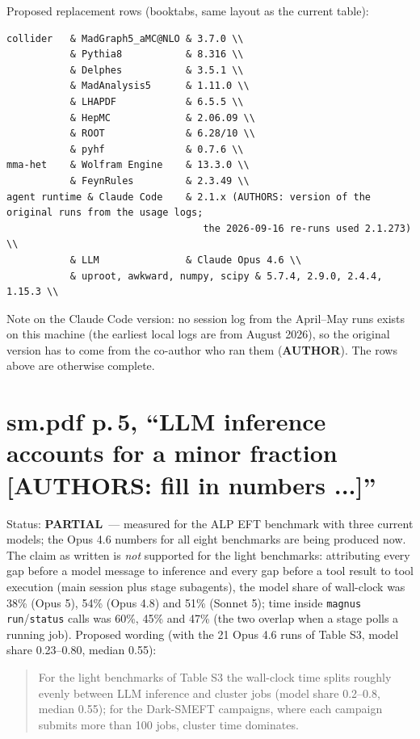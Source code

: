\documentclass[11pt]{article}
\newcommand{\statuspartial}{\textcolor{orange!80!black}{\textbf{PARTIAL}}}
\newcommand{\statusauthor}{\textcolor{red!70!black}{\textbf{AUTHOR}}}
\begin{document}
\noindent Proposed replacement rows (booktabs, same layout as the current table):
\begin{verbatim}
collider   & MadGraph5_aMC@NLO & 3.7.0 \\
           & Pythia8           & 8.316 \\
           & Delphes           & 3.5.1 \\
           & MadAnalysis5      & 1.11.0 \\
           & LHAPDF            & 6.5.5 \\
           & HepMC             & 2.06.09 \\
           & ROOT              & 6.28/10 \\
           & pyhf              & 0.7.6 \\
mma-het    & Wolfram Engine    & 13.3.0 \\
           & FeynRules         & 2.3.49 \\
agent runtime & Claude Code    & 2.1.x (AUTHORS: version of the original runs from the usage logs;
                                  the 2026-09-16 re-runs used 2.1.273) \\
           & LLM               & Claude Opus 4.6 \\
           & uproot, awkward, numpy, scipy & 5.7.4, 2.9.0, 2.4.4, 1.15.3 \\
\end{verbatim}
Note on the Claude Code version: no session log from the April--May runs exists on this machine (the earliest local
logs are from August 2026), so the original version has to come from the co-author who ran them (\statusauthor). The rows
above are otherwise complete.

\section{sm.pdf p.\,5, ``LLM inference accounts for a minor fraction [AUTHORS: fill in numbers ...]''}
Status: \statuspartial\ --- measured for the ALP EFT benchmark with three current models; the Opus 4.6 numbers for all
eight benchmarks are being produced now. The claim as written is \emph{not} supported for the light benchmarks:
attributing every gap before a model message to inference and every gap before a tool result to tool execution
(main session plus stage subagents), the model share of wall-clock was 38\% (Opus 5), 54\% (Opus 4.8) and 51\%
(Sonnet 5); time inside \texttt{magnus run}/\texttt{status} calls was 60\%, 45\% and 47\% (the two overlap when a
stage polls a running job). Proposed wording (with the 21 Opus 4.6 runs of Table S3, model share 0.23--0.80, median 0.55):
\begin{quote}
For the light benchmarks of Table S3 the wall-clock time splits roughly evenly between LLM inference and cluster
jobs (model share 0.2--0.8, median 0.55); for the Dark-SMEFT campaigns, where each campaign submits more than 100 jobs, cluster
time dominates.
\end{quote}
\end{document}
